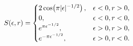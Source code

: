 \[S(\epsilon,r)=\begin{cases}2\mathop{\cos\/}\nolimits\!\left(\pi|\epsilon|^{-1/%
2}\right),&\epsilon<0,r>0,\\
0,&\epsilon<0,r<0,\\
e^{\pi\epsilon^{-1/2}},&\epsilon>0,r>0,\\
e^{-\pi\epsilon^{-1/2}},&\epsilon>0,r<0.\end{cases}\]